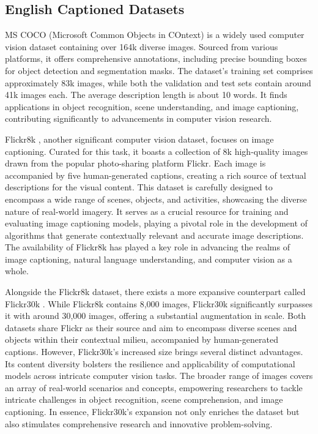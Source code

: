 \documentclass[runningheads]{llncs}
\begin{document}
\subsection{English Captioned Datasets}
MS COCO (Microsoft Common Objects in COntext) \cite{MSCOCO} is a widely used computer vision dataset containing over 164k diverse images. Sourced from various platforms, it offers comprehensive annotations, including precise bounding boxes for object detection and segmentation masks. The dataset's training set comprises approximately 83k images, while both the validation and test sets contain around 41k images each. The average description length is about 10 words. It finds applications in object recognition, scene understanding, and image captioning, contributing significantly to advancements in computer vision research.

Flickr8k \cite{Flickr8k}, another significant computer vision dataset, focuses on image captioning. Curated for this task, it boasts a collection of 8k high-quality images drawn from the popular photo-sharing platform Flickr. Each image is accompanied by five human-generated captions, creating a rich source of textual descriptions for the visual content. This dataset is carefully designed to encompass a wide range of scenes, objects, and activities, showcasing the diverse nature of real-world imagery. It serves as a crucial resource for training and evaluating image captioning models, playing a pivotal role in the development of algorithms that generate contextually relevant and accurate image descriptions. The availability of Flickr8k has played a key role in advancing the realms of image captioning, natural language understanding, and computer vision as a whole.

Alongside the Flickr8k dataset, there exists a more expansive counterpart called Flickr30k \cite{Flickr30k}. While Flickr8k contains 8,000 images, Flickr30k significantly surpasses it with around 30,000 images, offering a substantial augmentation in scale. Both datasets share Flickr as their source and aim to encompass diverse scenes and objects within their contextual milieu, accompanied by human-generated captions.
However, Flickr30k's increased size brings several distinct advantages. Its content diversity bolsters the resilience and applicability of computational models across intricate computer vision tasks. The broader range of images covers an array of real-world scenarios and concepts, empowering researchers to tackle intricate challenges in object recognition, scene comprehension, and image captioning. In essence, Flickr30k's expansion not only enriches the dataset but also stimulates comprehensive research and innovative problem-solving.
\end{document}
